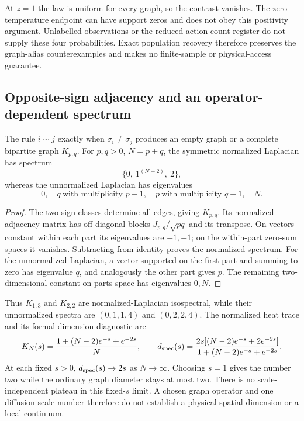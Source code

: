 At \(z=1\) the law is uniform for every graph, so the contrast vanishes.
The zero-temperature endpoint can have support zeros and does not obey
this positivity argument.  Unlabelled observations or the reduced
action-count register do not supply these four probabilities.  Exact
population recovery therefore preserves the graph-alias counterexamples
and makes no finite-sample or physical-access guarantee.

\subsection{Opposite-sign adjacency and an operator-dependent spectrum}
\label{fin:spectra}

\begin{proposition}\label{fin:bipartite-spectrum}
The rule \(i\sim j\) exactly when \(\sigma_i\ne\sigma_j\) produces
an empty graph or a complete bipartite graph \(K_{p,q}\).
For \(p,q>0\), \(N=p+q\), the symmetric normalized Laplacian has spectrum
\[
 \{0,\ 1^{(N-2)},\ 2\},
\]
whereas the unnormalized Laplacian has eigenvalues
\[
 0,\quad q\ \text{with multiplicity }p-1,\quad
 p\ \text{with multiplicity }q-1,\quad N.
\]
\end{proposition}
\begin{proof}
The two sign classes determine all edges, giving \(K_{p,q}\).
Its normalized adjacency matrix has off-diagonal blocks
\(J_{p,q}/\sqrt{pq}\) and its transpose.  On vectors constant within
each part its eigenvalues are \(+1,-1\); on the within-part
zero-sum spaces it vanishes.  Subtracting from identity proves the
normalized spectrum.
For the unnormalized Laplacian, a vector supported on the first part
and summing to zero has eigenvalue \(q\), and analogously the other
part gives \(p\).  The remaining two-dimensional constant-on-parts
space has eigenvalues \(0,N\).
\end{proof}

Thus \(K_{1,3}\) and \(K_{2,2}\) are normalized-Laplacian isospectral,
while their unnormalized spectra are \((0,1,1,4)\) and \((0,2,2,4)\).
The normalized heat trace and its formal dimension diagnostic are
\[
 K_N(s)=\frac{1+(N-2)e^{-s}+e^{-2s}}N,\qquad
 d_{\rm spec}(s)=
 \frac{2s[(N-2)e^{-s}+2e^{-2s}]}
      {1+(N-2)e^{-s}+e^{-2s}}.
\]
At each fixed \(s>0\), \(d_{\rm spec}(s)\to2s\) as \(N\to\infty\).
Choosing \(s=1\) gives the number two while the ordinary graph diameter
stays at most two.  There is no scale-independent plateau in this
fixed-\(s\) limit.  A chosen graph operator and one diffusion-scale
number therefore do not establish a physical spatial dimension or
a local continuum.

